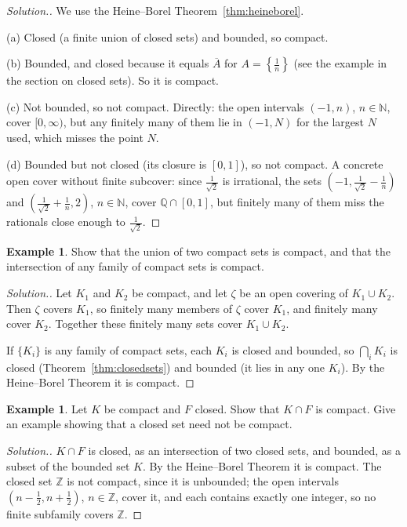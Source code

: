 \documentclass[11pt,a4paper]{article}
\numberwithin{equation}{section}
\theoremstyle{definition}
\newtheorem{exa}[thm]{Example}
\newenvironment{solution}
  {\renewcommand{\qedsymbol}{}\begin{proof}[\textit{Solution}.]}
  {\end{proof}}
\begin{document}
\begin{solution}
We use the Heine--Borel Theorem~\ref{thm:heineborel}.

(a) Closed (a finite union of closed sets) and bounded, so compact.

(b) Bounded, and closed because it equals $\overline{A}$ for $A = \left\{\frac{1}{n}\right\}$ (see the example in the section on closed sets). So it is compact.

(c) Not bounded, so not compact. Directly: the open intervals $(-1,n)$, $n\in\mathbb{N}$, cover $[0,\infty)$, but any finitely many of them lie in $(-1,N)$ for the largest $N$ used, which misses the point $N$.

(d) Bounded but not closed (its closure is $[0,1]$), so not compact. A concrete open cover without finite subcover: since $\frac{1}{\sqrt{2}}$ is irrational, the sets $\left(-1,\frac{1}{\sqrt{2}}-\frac{1}{n}\right)$ and $\left(\frac{1}{\sqrt{2}}+\frac{1}{n},2\right)$, $n\in\mathbb{N}$, cover $\mathbb{Q}\cap[0,1]$, but finitely many of them miss the rationals close enough to $\frac{1}{\sqrt{2}}$.
\end{solution}

\begin{exa}
Show that the union of two compact sets is compact, and that the intersection of any family of compact sets is compact.
\end{exa}

\begin{solution}
Let $K_1$ and $K_2$ be compact, and let $\zeta$ be an open covering of $K_1\cup K_2$. Then $\zeta$ covers $K_1$, so finitely many members of $\zeta$ cover $K_1$, and finitely many cover $K_2$. Together these finitely many sets cover $K_1\cup K_2$.

If $\{K_i\}$ is any family of compact sets, each $K_i$ is closed and bounded, so $\bigcap_i K_i$ is closed (Theorem~\ref{thm:closedsets}) and bounded (it lies in any one $K_i$). By the Heine--Borel Theorem it is compact.
\end{solution}

\begin{exa}
Let $K$ be compact and $F$ closed. Show that $K\cap F$ is compact. Give an example showing that a closed set need not be compact.
\end{exa}

\begin{solution}
$K\cap F$ is closed, as an intersection of two closed sets, and bounded, as a subset of the bounded set $K$. By the Heine--Borel Theorem it is compact. The closed set $\mathbb{Z}$ is not compact, since it is unbounded; the open intervals $\left(n-\frac{1}{2},n+\frac{1}{2}\right)$, $n\in\mathbb{Z}$, cover it, and each contains exactly one integer, so no finite subfamily covers $\mathbb{Z}$.
\end{solution}
\end{document}
